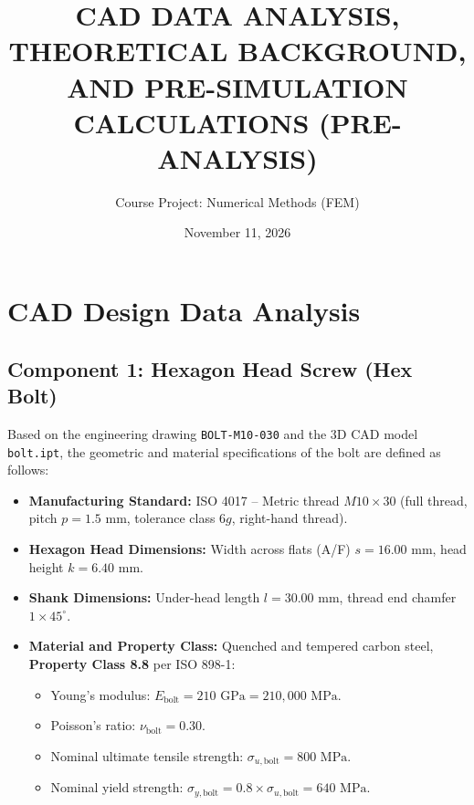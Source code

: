 \documentclass[12pt,a4paper]{article}
\title{\textbf{CAD DATA ANALYSIS, THEORETICAL BACKGROUND, \\ AND PRE-SIMULATION CALCULATIONS (PRE-ANALYSIS)}}
\author{Course Project: Numerical Methods (FEM)}
\date{November 11, 2026}
\begin{document}
\maketitle

\section{CAD Design Data Analysis}

\subsection{Component 1: Hexagon Head Screw (Hex Bolt)}
Based on the engineering drawing \texttt{BOLT-M10-030} and the 3D CAD model \texttt{bolt.ipt}, the geometric and material specifications of the bolt are defined as follows:
\begin{itemize}
    \item \textbf{Manufacturing Standard:} ISO 4017 -- Metric thread $M10 \times 30$ (full thread, pitch $p = 1.5\text{ mm}$, tolerance class $6g$, right-hand thread).
    \item \textbf{Hexagon Head Dimensions:} Width across flats (A/F) $s = 16.00\text{ mm}$, head height $k = 6.40\text{ mm}$.
    \item \textbf{Shank Dimensions:} Under-head length $l = 30.00\text{ mm}$, thread end chamfer $1 \times 45^\circ$.
    \item \textbf{Material and Property Class:} Quenched and tempered carbon steel, \textbf{Property Class 8.8} per ISO 898-1:
    \begin{itemize}
        \item Young's modulus: $E_{\text{bolt}} = 210\text{ GPa} = 210,000\text{ MPa}$.
        \item Poisson's ratio: $\nu_{\text{bolt}} = 0.30$.
        \item Nominal ultimate tensile strength: $\sigma_{u,\text{bolt}} = 800\text{ MPa}$.
        \item Nominal yield strength: $\sigma_{y,\text{bolt}} = 0.8 \times \sigma_{u,\text{bolt}} = 640\text{ MPa}$.
    \end{itemize}
\end{itemize}
\end{document}
